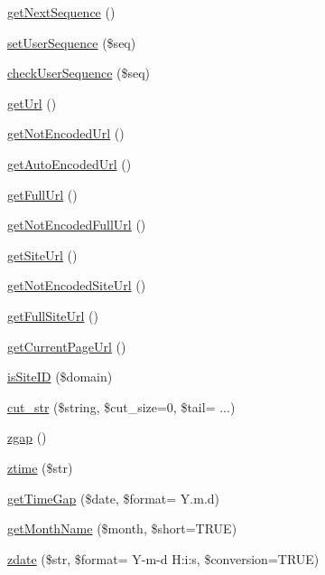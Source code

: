 \begin{DoxyCompactItemize}
\item 
\hyperlink{func_8inc_8php_a5a97b458f9c5b4fe3574671840aee27c}{get\+Next\+Sequence} ()
\item 
\hyperlink{func_8inc_8php_aa3832c4893dae39987cf056c24c29392}{set\+User\+Sequence} (\$seq)
\item 
\hyperlink{func_8inc_8php_a56536fb66de4e320aaac07b82e6c2e21}{check\+User\+Sequence} (\$seq)
\item 
\hyperlink{func_8inc_8php_accd14bda49a1044b4d8dd93f020f11ee}{get\+Url} ()
\item 
\hyperlink{func_8inc_8php_aa73dbeb07c5bcac26c24fe4c6b05d8d2}{get\+Not\+Encoded\+Url} ()
\item 
\hyperlink{func_8inc_8php_a77e631a54eea5ecea3a77feb56129104}{get\+Auto\+Encoded\+Url} ()
\item 
\hyperlink{func_8inc_8php_acaf8f155dd27e065b7fb0f5c3f702027}{get\+Full\+Url} ()
\item 
\hyperlink{func_8inc_8php_a06116450c538bd1f67cf3209bfd16610}{get\+Not\+Encoded\+Full\+Url} ()
\item 
\hyperlink{func_8inc_8php_a2d80ea9652d1586d5dcd03d022150f73}{get\+Site\+Url} ()
\item 
\hyperlink{func_8inc_8php_aa09cef59156d4afaeee54a675605f95d}{get\+Not\+Encoded\+Site\+Url} ()
\item 
\hyperlink{func_8inc_8php_a778b55fa9ebcf9a5ef0b017b998d9894}{get\+Full\+Site\+Url} ()
\item 
\hyperlink{func_8inc_8php_ae9a94dea2a8e11ebf9010683a124fabf}{get\+Current\+Page\+Url} ()
\item 
\hyperlink{func_8inc_8php_aa85a46b82e60cc2c64682ea6464eeeff}{is\+Site\+I\+D} (\$domain)
\item 
\hyperlink{func_8inc_8php_ad7b240a38cc63f3a576d4b7c391fda16}{cut\+\_\+str} (\$string, \$cut\+\_\+size=0, \$tail= \textquotesingle{}...\textquotesingle{})
\item 
\hyperlink{func_8inc_8php_acac2e71b99c40a4736c3ba62c0b8ac70}{zgap} ()
\item 
\hyperlink{func_8inc_8php_afa835b7d80cf54db78fd0cb7d81c7968}{ztime} (\$str)
\item 
\hyperlink{func_8inc_8php_a8c68983e66e199e8b7f1b5dad8f0c3ab}{get\+Time\+Gap} (\$date, \$format= \textquotesingle{}Y.\+m.\+d\textquotesingle{})
\item 
\hyperlink{func_8inc_8php_adc2ced210718f27abac98392564a7b82}{get\+Month\+Name} (\$month, \$short=T\+R\+U\+E)
\item 
\hyperlink{func_8inc_8php_acccf91c81ea5145f4704bdd53421917b}{zdate} (\$str, \$format= \textquotesingle{}Y-\/m-\/d H\+:i\+:s\textquotesingle{}, \$conversion=T\+R\+U\+E)

\end{DoxyCompactItemize}

